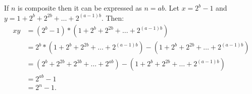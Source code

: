\begin{myproof}
  If $n$ is composite then it can be expressed as  $n = ab$. 
  Let  $x = 2^b -1$ and  $y = 1 + 2^b + 2^{2b} + \ldots + 2^{(a-1)b}$.
  Then:
\begin{align*}
  xy &= (2^b - 1)*(1 + 2^b + 2^{2b} + \ldots + 2^{(a-1)b})\\
     &= 2^b * (1 + 2^b + 2^{2b} + \ldots + 2^{(a-1)b}) -  (1 + 2^b + 2^{2b} + \ldots + 2^{(a-1)b})\\
     &= (2^b + 2^{2b} + 2^{3b} + \ldots + 2^{ab}) -  (1 + 2^b + 2^{2b} + \ldots + 2^{(a-1)b})\\
     &= 2^{ab} - 1\\
     &= 2^n - 1.  
\end{align*}
\end{myproof}



